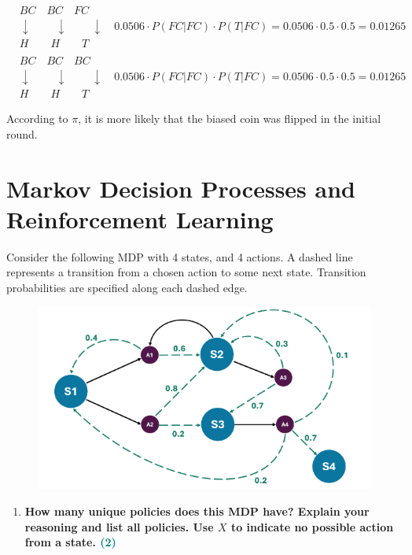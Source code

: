 \documentclass[a4paper]{article}
\begin{document}
\begin{sloppypar}
\begin{enumerate}[start=6,label=Q\arabic*,left=0pt]
\begin{align*}
        & BC \quad BC \quad FC \\
        & \downarrow \quad \quad \: \downarrow \quad \quad \: \downarrow \quad 0.0506 \cdot P(FC | FC) \cdot P(T | FC) = 0.0506 \cdot 0.5 \cdot 0.5 = 0.01265 \\
        & H \quad \quad H \quad \quad T \\\\
        & BC \quad BC \quad BC \\
        & \downarrow \quad \quad \: \downarrow \quad \quad \: \downarrow \quad 0.0506 \cdot P(FC | FC) \cdot P(T | FC) = 0.0506 \cdot 0.5 \cdot 0.5 = 0.01265 \\
        & H \quad \quad H \quad \quad T
    \end{align*}

    According to $\pi$, it is more likely that the biased coin was flipped in 
    the initial round.

\end{enumerate}

\section{Markov Decision Processes and Reinforcement Learning}

Consider the following MDP with 4 states, and 4 actions. A dashed line represents a
transition from a chosen action to some next state. Transition probabilities are specified
along each dashed edge.

\begin{figure}[H]
    \centering  
    \includegraphics[height=0.3\textheight]{mdp_and_rl.png}
    \label{fig:mdp_and_rl}
\end{figure}

\begin{enumerate}[start=8,label=Q\arabic*,left=0pt]
    \item \textbf{How many unique policies does this MDP have? Explain your reasoning and list all policies. Use $X$ to indicate no possible action from a state. \hfill \textcolor{teal}{(2)}}
    

\end{enumerate}
\end{sloppypar}
\end{document}
